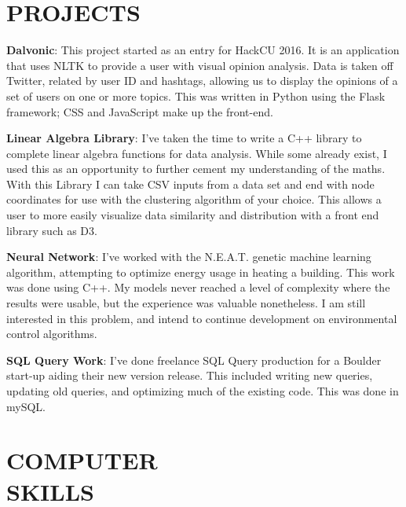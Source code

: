 \documentclass[margin]{res}
\begin{document}
\begin{resume}

\section{PROJECTS}
\par
\textbf{Dalvonic}: 
This project started as an entry for HackCU 2016. It is an application that uses NLTK to provide a user with visual opinion analysis. Data is taken off Twitter, related by user ID and hashtags, allowing us to display the opinions of a set of users on one or more topics. This was written in Python using the Flask framework; CSS and JavaScript make up the front-end.
\par
\textbf{Linear Algebra Library}:
I've taken the time to write a C++ library to complete linear algebra functions for data analysis. While some already exist, I used this as an opportunity to further cement my understanding of the maths. With this Library I can take CSV inputs from a data set and end with node coordinates for use with the clustering algorithm of your choice. This allows a user to more easily visualize data similarity and distribution with a front end library such as D3. 
\par
\textbf{Neural Network}: 
I've worked with the N.E.A.T. genetic machine learning algorithm, attempting to optimize energy usage in heating a building. This work was done using C++. My models never reached a level of complexity where the results were usable, but the experience was valuable nonetheless. I am still interested in this problem, and intend to continue development on environmental control algorithms.
\par
\textbf{SQL Query Work}: 
I've done freelance SQL Query production for a Boulder start-up aiding their new version release. This included writing new queries, updating old queries, and optimizing much of the existing code. This was done in mySQL.


\section{COMPUTER\\SKILLS}


\end{resume}
\end{document}
